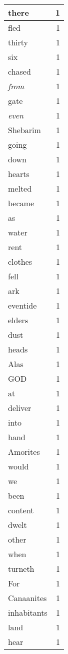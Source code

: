 \begin{center}
\begin{longtable}{l|r}
there & 1\\ \hline 
fled & 1\\ \hline 
thirty & 1\\ \hline 
six & 1\\ \hline 
chased & 1\\ \hline 
\emph{from} & 1\\ \hline 
gate & 1\\ \hline 
\emph{even} & 1\\ \hline 
Shebarim & 1\\ \hline 
going & 1\\ \hline 
down & 1\\ \hline 
hearts & 1\\ \hline 
melted & 1\\ \hline 
became & 1\\ \hline 
as & 1\\ \hline 
water & 1\\ \hline 
rent & 1\\ \hline 
clothes & 1\\ \hline 
fell & 1\\ \hline 
ark & 1\\ \hline 
eventide & 1\\ \hline 
elders & 1\\ \hline 
dust & 1\\ \hline 
heads & 1\\ \hline 
Alas & 1\\ \hline 
GOD & 1\\ \hline 
at & 1\\ \hline 
deliver & 1\\ \hline 
into & 1\\ \hline 
hand & 1\\ \hline 
Amorites & 1\\ \hline 
would & 1\\ \hline 
we & 1\\ \hline 
been & 1\\ \hline 
content & 1\\ \hline 
dwelt & 1\\ \hline 
other & 1\\ \hline 
when & 1\\ \hline 
turneth & 1\\ \hline 
For & 1\\ \hline 
Canaanites & 1\\ \hline 
inhabitants & 1\\ \hline 
land & 1\\ \hline 
hear & 1\\ \hline 

\end{longtable}
\end{center}
